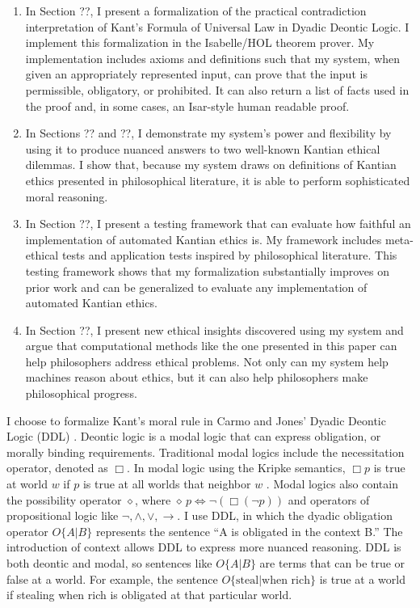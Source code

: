 \begin{isabellebody}
\begin{isamarkuptext}
\begin{enumerate}
\item In Section ??, I present a formalization of the practical contradiction interpretation of Kant's 
Formula of Universal Law in Dyadic Deontic Logic. I implement this formalization in the Isabelle/HOL
theorem prover. My implementation includes axioms and definitions such that my system, when given an appropriately
represented input, can prove that the input is permissible, obligatory, or prohibited. It can also return
a list of facts used in the proof and, in some cases, an Isar-style human readable proof. 

\item In Sections ?? and ??, I demonstrate my system's power and flexibility by 
using it to produce nuanced answers to two well-known Kantian ethical dilemmas. I show that, because 
my system draws on definitions of Kantian ethics presented in philosophical literature, it is able 
to perform sophisticated moral reasoning. 

\item In Section ??, I present a testing framework that can evaluate how faithful an implementation 
of automated Kantian ethics is. My framework includes meta-ethical tests and application tests inspired by philosophical
literature. This testing framework shows that my formalization substantially improves on prior work and can 
be generalized to evaluate any implementation of automated Kantian ethics.

\item In Section ??, I present new ethical insights discovered using my system and argue that
computational methods like the one presented in this paper can help philosophers address ethical problems.
Not only can my system help machines reason about ethics, but it can also help philosophers make philosophical
progress.
\end{enumerate}%
\end{isamarkuptext}\isamarkuptrue%
%
\begin{isamarkuptext}%
I choose to formalize Kant's moral rule in Carmo and Jones' Dyadic Deontic Logic (DDL) \citep{CJDDL}. Deontic 
logic is a modal logic that can express obligation, or morally binding requirements. Traditional modal 
logics include the necessitation operator, denoted as $\Box$. In modal logic using the Kripke semantics, 
$\Box p$ is true at world $w$ if $p$ is true at all worlds that neighbor $w$ \citep{cresswell}. Modal 
logics  also contain the possibility operator $\diamond$, where $\diamond \, p \iff \neg (\Box (\neg p))$ 
and operators of propositional logic like $\neg, \wedge, \vee, \rightarrow$. I use DDL, in which
the dyadic obligation operator $O\{A \vert B\}$ represents the sentence ``A is obligated in the context B.'' 
The introduction of context allows DDL to express more nuanced reasoning. DDL is both deontic and modal, 
so sentences like $O\{A \vert B\}$ are terms that can be true or false at a world. For example, the 
sentence $O \{ \text{steal} \vert \text{when rich}\}$ is true at a world if stealing when rich is 
obligated at that particular world. 


\end{isamarkuptext}
\end{isabellebody}
